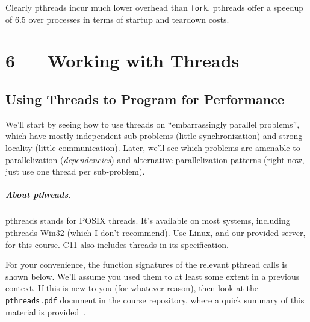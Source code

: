 \documentclass[a4paper]{report}
\newcommand{\CPP}{C\nolinebreak\hspace{-.05em}\raisebox{.4ex}{\tiny\bf +}\nolinebreak\hspace{-.10em}\raisebox{.4ex}{\tiny\bf +}}
\def\CPP{{C\nolinebreak[4]\hspace{-.05em}\raisebox{.4ex}{\tiny\bf ++}}}
\begin{document}
Clearly pthreads incur much lower overhead than {\tt fork}. pthreads
offer a speedup of 6.5 over processes in terms of startup and teardown costs.














\chapter*{6 --- Working with Threads}


\section*{Using Threads to Program for Performance}
We'll start by seeing how to use threads on ``embarrassingly parallel problems'', which have mostly-independent sub-problems (little synchronization) and strong locality (little communication). Later, we'll see which problems are amenable to parallelization (\emph{dependencies}) and alternative parallelization patterns (right now, just use one thread per sub-problem).

\paragraph{About pthreads.} pthreads stands for POSIX threads. It's available
on most systems, including pthreads Win32 (which I don't recommend).
Use Linux, and our provided server, for this course. \CPP 11 also includes threads
in its specification.

For your convenience, the function signatures of the relevant pthread calls is shown below. We'll assume you used them to at least some extent in a previous context. If this is new to you (for whatever reason), then look at the \texttt{pthreads.pdf} document in the course repository, where a quick summary of this material is provided~\cite{pthreads}.
\end{document}
